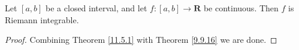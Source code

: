\begin{corollary}\label{11.5.2}
    Let \([a, b]\) be a closed interval, and let \(f : [a, b] \to \mathbf{R}\) be continuous.
    Then \(f\) is Riemann integrable.
\end{corollary}

\begin{proof}
    Combining Theorem \ref{11.5.1} with Theorem \ref{9.9.16} we are done.
\end{proof}